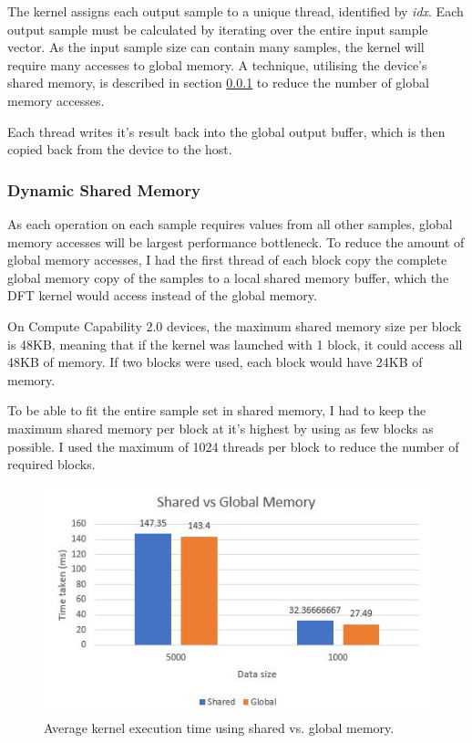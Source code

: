 \documentclass[11pt,a4paper]{article}
\begin{document}
The kernel assigns each output sample to a unique thread, identified by \textit{idx}. Each output sample must be calculated by iterating over the entire input sample vector. As the input sample size can contain many samples, the kernel will require many accesses to global memory. A technique, utilising the device's shared memory, is described in section \ref{sect:Dynamic Shared Memory} to reduce the number of global memory accesses.

Each thread writes it's result back into the global output buffer, which is then copied back from the device to the host.

\subsubsection{Dynamic Shared Memory} \label{sect:Dynamic Shared Memory}
As each operation on each sample requires values from all other samples, global memory accesses will be largest performance bottleneck. To reduce the amount of global memory accesses, I had the first thread of each block copy the complete global memory copy of the samples to a local shared memory buffer, which the DFT kernel would access instead of the global memory. 

On Compute Capability 2.0 devices, the maximum shared memory size per block is 48KB, meaning that if the kernel was launched with 1 block, it could access all 48KB of memory. If two blocks were used, each block would have 24KB of memory. 

To be able to fit the entire sample set in shared memory, I had to keep the maximum shared memory per block at it's highest by using as few blocks as possible. I used the maximum of 1024 threads per block to reduce the number of required blocks.  

\begin{figure}
\begin{center}
\includegraphics[scale=0.6]{shared_vs_global_graph}
\end{center}
\caption{Average kernel execution time using shared vs. global memory.}
\label{fig:shared_vs_global_graph}
\end{figure}
\end{document}
